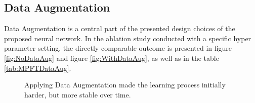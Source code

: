 \subsection{Data Augmentation}
Data Augmentation is a central part of the presented design choices of the proposed neural network. In the ablation study conducted with a specific hyper parameter setting, the directly comparable outcome is presented in figure \ref{fig:NoDataAug} and figure \ref{fig:WithDataAug}, as well as in the table \ref{tab:MPFTDataAug}.

\begin{figure}[H]
  \centering
  \hfill
  \caption{Applying Data Augmentation made the learning process initially harder, but more stable over time.}
\end{figure}


